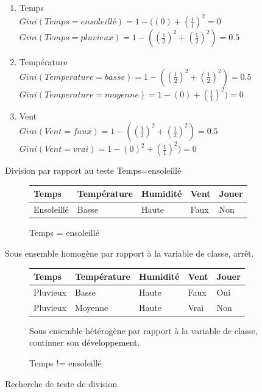 \documentclass[a4paper, 11pt]{report}
\begin{document}
\begin{enumerate}
\begin{enumerate}
\item Temps\\
$Gini(Temps = ensoleillé) = 1 - ( ( 0 ) + (\frac{1}{1})^2 =0 $\\
$Gini(Temps = pluvieux) = 1 - ((\frac{1}{2})^2 + (\frac{1}{2})^2)=0.5 $\\
\item Température\\
$Gini(Temperature = basse) = 1 - ((\frac{1}{2})^2 + (\frac{1}{2})^2)=0.5 $\\
$Gini(Temperature = moyenne) = 1 - ( 0 ) + (\frac{1}{1})^2)=0 $\\

\item Vent\\
$Gini(Vent = faux) = 1 - ((\frac{1}{2})^2 + (\frac{1}{2})^2)=0.5 $\\
$Gini(Vent = vrai) = 1 - ( 0 )^2 + (\frac{1}{1})^2)=0 $
\end{enumerate}
Division par rapport au teste Temps=ensoleillé

\begin{figure}[!h]
\caption{Temps = ensoleillé}
\label{ens11}
\begin{center}
\begin{tabular}{| l | l | l | l | l |}
\hline
\rowcolor{gray!25}
Temps & Température & Humidité & Vent & Jouer \\
\hline
Ensoleillé & Basse & Haute & Faux &  \cellcolor{green}Non \\
\hline
\end{tabular}
\end{center}
\end{figure}
Sous ensemble homogène par rapport à la variable de classe, arrêt.

\begin{figure}[!h]
\caption{Temps != ensoleillé}
\label{ens12}
\begin{center}
\begin{tabular}{| l | l | l | l | l |}
\hline
\rowcolor{gray!25}
Temps & Température & Humidité & Vent & Jouer \\
\hline
Pluvieux & Basse & Haute & Faux & \cellcolor{yellow}Oui \\
\hline
Pluvieux & Moyenne & Haute & Vrai &  \cellcolor{green}Non \\
\hline
\end{tabular}
\end{center}
Sous ensemble hétérogène par rapport à la variable de classe, continuer son développement.
\end{figure}
Recherche de teste de division 


\end{enumerate}
\end{document}
